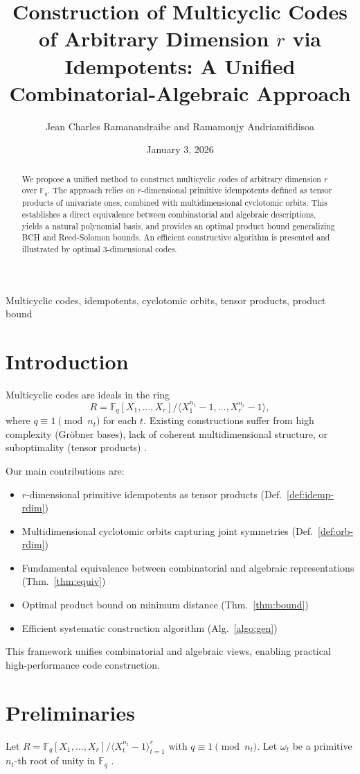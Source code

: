 \documentclass[10pt,twocolumn]{IEEEtran}
\title{Construction of Multicyclic Codes of Arbitrary Dimension $r$ via Idempotents: A Unified Combinatorial-Algebraic Approach}
\author{Jean Charles Ramanandraibe and Ramamonjy Andriamifidisoa}
\date{January 3, 2026}
\theoremstyle{plain}
\theoremstyle{definition}
\newcommand{\Fq}{\mathbb{F}_q}
\begin{document}
\maketitle
\begin{abstract}
We propose a unified method to construct multicyclic codes of arbitrary dimension $r$ over $\Fq$. The approach relies on $r$-dimensional primitive idempotents defined as tensor products of univariate ones, combined with multidimensional cyclotomic orbits. This establishes a direct equivalence between combinatorial and algebraic descriptions, yields a natural polynomial basis, and provides an optimal product bound generalizing BCH and Reed-Solomon bounds. An efficient constructive algorithm is presented and illustrated by optimal 3-dimensional codes.
\end{abstract}
\begin{IEEEkeywords}
Multicyclic codes, idempotents, cyclotomic orbits, tensor products, product bound
\end{IEEEkeywords}
\section{Introduction}
Multicyclic codes are ideals in the ring
\[
R = \Fq[X_1,\dots,X_r]/\langle X_1^{n_1}-1,\dots,X_r^{n_r}-1\rangle,
\]
where $q\equiv 1\pmod{n_t}$ for each $t$. Existing constructions suffer from high complexity (Gröbner bases), lack of coherent multidimensional structure, or suboptimality (tensor products) \cite{sepasdar2022, bhardwaj2022}.

Our main contributions are:
\begin{itemize}
    \item $r$-dimensional primitive idempotents as tensor products (Def.~\ref{def:idemp-rdim})
    \item Multidimensional cyclotomic orbits capturing joint symmetries (Def.~\ref{def:orb-rdim})
    \item Fundamental equivalence between combinatorial and algebraic representations (Thm.~\ref{thm:equiv})
    \item Optimal product bound on minimum distance (Thm.~\ref{thm:bound})
    \item Efficient systematic construction algorithm (Alg.~\ref{algo:gen})
\end{itemize}
This framework unifies combinatorial and algebraic views, enabling practical high-performance code construction.

\section{Preliminaries}
Let $R = \Fq[X_1,\dots,X_r]/\langle X_t^{n_t}-1\rangle_{t=1}^r$ with $q\equiv1\pmod{n_t}$. Let $\omega_t$ be a primitive $n_t$-th root of unity in $\Fq$ \cite{lidl1997}.
\end{document}

